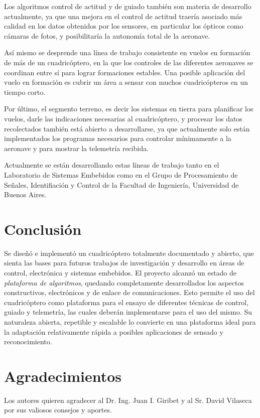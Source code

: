 \documentclass[a4paper, conference]{IEEEtran}
\begin{document}
Los algoritmos control de actitud y de guiado también son materia de desarrollo actualmente, ya que una mejora en el control de actitud traería asociado más calidad en los datos obtenidos por los sensores, en particular los ópticos como cámaras de fotos, y posibilitaría la autonomía total de la aeronave.

Así mismo se desprende una línea de trabajo consistente en vuelos en formación de más de un cuadricóptero, en la que los controles de las diferentes aeronaves se coordinan entre sí para lograr formaciones estables. Una posible aplicación del vuelo en formación es cubrir un área a sensar con muchos cuadricópteros en un tiempo corto.

Por último, el segmento terreno, es decir los sistemas en tierra para planificar los vuelos, darle las indicaciones necesarias al cuadricóptero, y procesar los datos recolectados también está abierto a desarrollarse, ya que actualmente solo están implementados los programas necesarios para controlar mínimamente a la aeronave y para mostrar la telemetría recibida.

Actualmente se están desarrollando estas líneas de trabajo tanto en el Laboratorio de Sistemas Embebidos como en el Grupo de Procesamiento de Señales, Identifiación y Control de la Facultad de Ingeniería, Universidad de Buenos Aires.

\vspace{5 mm}

\section*{Conclusión}

Se diseñó e implementó un cuadricóptero totalmente documentado y abierto, que sienta las bases para futuros trabajos de investigación y desarrollo en áreas de control, electrónica y sistemas embebidos. 
El proyecto alcanzó un estado de \emph{plataforma de algoritmos}, quedando completamente desarrollados los aspectos constructivos, electrónicos y de enlace de comunicaciones. Esto permite el uso del cuadricóptero como plataforma para el ensayo de diferentes técnicas de control, guiado y telemetría, las cuales deberán implementarse para el uso del mismo.
Su naturaleza abierta, repetible y escalable lo convierte en una plataforma ideal  para la adaptación relativamente rápida a posibles aplicaciones de sensado y reconocimiento.


\vspace{5 mm}

\section*{Agradecimientos}
Los autores quieren agradecer al Dr. Ing. Juan I. Giribet y al Sr. David Vilaseca por sus valiosos consejos y aportes.
\end{document}
